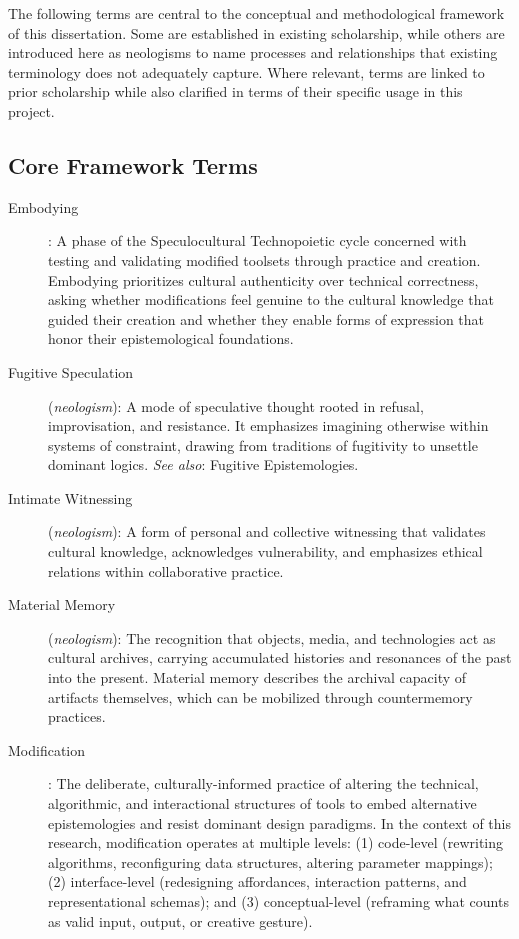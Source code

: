 The following terms are central to the conceptual and methodological framework of this dissertation. Some are established in existing scholarship, while others are introduced here as neologisms to name processes and relationships that existing terminology does not adequately capture. Where relevant, terms are linked to prior scholarship while also clarified in terms of their specific usage in this project.

\subsection*{Core Framework Terms}

\begin{description}
	\item[Embodying]: A phase of the Speculocultural Technopoietic cycle concerned with testing and validating modified toolsets through practice and creation. Embodying prioritizes cultural authenticity over technical correctness, asking whether modifications feel genuine to the cultural knowledge that guided their creation and whether they enable forms of expression that honor their epistemological foundations.
	
	\item[Fugitive Speculation] (\textit{neologism}): A mode of speculative thought rooted in refusal, improvisation, and resistance. It emphasizes imagining otherwise within systems of constraint, drawing from traditions of fugitivity to unsettle dominant logics. \textit{See also}: Fugitive Epistemologies.
	
	\item[Intimate Witnessing] (\textit{neologism}): A form of personal and collective witnessing that validates cultural knowledge, acknowledges vulnerability, and emphasizes ethical relations within collaborative practice.
	
	\item[Material Memory] (\textit{neologism}): The recognition that objects, media, and technologies act as cultural archives, carrying accumulated histories and resonances of the past into the present. Material memory describes the archival capacity of artifacts themselves, which can be mobilized through countermemory practices.
	
	\item[Modification]: The deliberate, culturally-informed practice of altering the technical, algorithmic, and interactional structures of tools to embed alternative epistemologies and resist dominant design paradigms. In the context of this research, modification operates at multiple levels: (1) code-level (rewriting algorithms, reconfiguring data structures, altering parameter mappings); (2) interface-level (redesigning affordances, interaction patterns, and representational schemas); and (3) conceptual-level (reframing what counts as valid input, output, or creative gesture).
	

\end{description}
